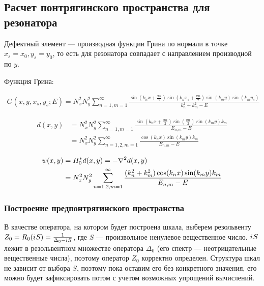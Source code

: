 

\subsection{Расчет понтрягинского пространства для резонатора}
Дефектный элемент — производная функции Грина по нормали в точке $x_s = x_0, y_s = y_0$, то есть для резонатора совпадает с направлением производной по $y$.

Функция Грина:

\begin{align*}
G(x, y, x_s, y_s; E) = N_x^2 N_y^2 \sum\limits_{n = 1, m = 1}^\infty \frac{\sin(k_n x + \frac{\pi n}{2}) \sin(k_n x_s  + \frac{\pi n}{2}) \sin(k_m y) \sin(k_m y_s)}{k_n^2 + k_m^2 - E}
\end{align*}

\begin{align*}
d(x, y)
&= N_x^2 N_y^2 \sum\limits_{n = 1, m = 1}^\infty \frac{\sin(k_n x + \frac{\pi n}{2}) \sin(\frac{\pi n}{2}) \sin(k_m y) k_m}{E_{n, m} - E} \\
& = N_x^2 N_y^2 \sum\limits_{n = 1,2, m = 1}^\infty \frac{\cos(k_n x) \sin(k_m y) k_m}{E_{n, m} - E}
\end{align*}

\begin{align*}
\psi(x, y)
& = H_0^* d(x, y) = - \laplacian d(x, y) \\
& = N_x^2 N_y^2 \sum\limits_{n = 1,2, m = 1}^\infty \frac{(k_n^2 + k_m^2) \cos(k_n x) \sin(k_m y) k_m}{E_{n, m} - E}
\end{align*}

\subsubsection{Построение предпонтрягинского пространства}
В качестве оператора, на котором будет построена шкала, выберем резольвенту $Z_0 = R_0({i\mkern1mu} S) = \frac{1}{\Delta_0 - {i\mkern1mu} S}$, где $S$ — произвольное ненулевое вещественное число. ${i\mkern1mu} S$ лежит в резольвентном множестве оператора $\Delta_0$ (его спектр — неотрицательные вещественные числа), поэтому оператор $Z_0$ корректно определен. Структура шкал не зависит от выбора $S$, поэтому пока оставим его без конкретного значения, его можно будет зафиксировать потом с учетом возможных упрощений вычислений.

